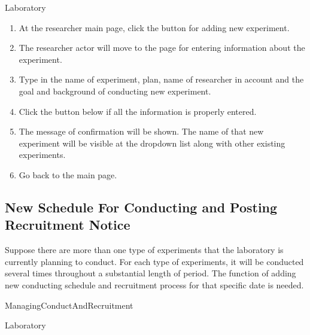 \documentclass[letterpaper, 10 pt, conference]{ieeeconf}  %
\begin{document}
Laboratory\\

\begin{enumerate}
\item At the researcher main page, click the button for adding new experiment.
\item The researcher actor will move to the page for entering information about the experiment.
\item Type in the name of experiment, plan, name of researcher in account and the goal and background of conducting new experiment.
\item Click the button below if all the information is properly entered. 
\item The message of confirmation will be shown. The name of that new experiment will be visible at the dropdown list along with other existing experiments. 
\item Go back to the main page.
\end{enumerate}


\subsection{New Schedule For Conducting and Posting Recruitment Notice}
Suppose there are more than one type of experiments that the laboratory is currently planning to conduct. For each type of experiments, it will be conducted several times throughout a substantial length of period. The function of adding new conducting schedule and recruitment process for that specific date is needed. \\

ManagingConductAndRecruitment\\

Laboratory\\
\end{document}
